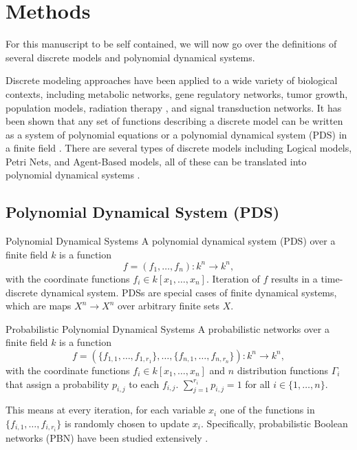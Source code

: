 \documentclass[11pt]{amsart}
\newenvironment{definition}[1][Definition]{\begin{trivlist}
\item[\hskip \labelsep {\bfseries #1}]}{\end{trivlist}}
\begin{document}
\section{Methods}
For this manuscript to be self contained, we will now go over the definitions
of several discrete models and polynomial dynamical systems.

Discrete modeling approaches have been applied
to a wide variety of biological contexts, including metabolic networks, gene
regulatory networks, tumor growth, population models, radiation therapy
\cite{Richard}, and signal transduction networks.
It has been shown that any set of functions describing a discrete model can be
written as a system of polynomial equations or a polynomial dynamical system
(PDS) in a finite field \cite{Lidl:1997}.
There are several types of discrete models including Logical models, Petri
Nets, and Agent-Based models, all of these can be translated into polynomial
dynamical systems \cite{Alan:Bioinf2010,Hinkelmann:2010}.

\subsection{Polynomial Dynamical System (PDS)}
\begin{definition}{Polynomial Dynamical Systems \cite{JLSS}}
A polynomial dynamical system (PDS) over a finite field $k$ is a function
$$f = (f_1, \ldots, f_n) : k^n \rightarrow k^n,$$
with the coordinate functions $f_i \in k[x_1, \ldots , x_n]$. Iteration of $f$ results
in a time-discrete dynamical system. PDSs are special cases of finite
dynamical systems, which are maps $X^n \rightarrow   X^n$ over arbitrary
finite sets $X$.
\end{definition}


\begin{definition}{Probabilistic Polynomial Dynamical Systems}
A probabilistic networks over a finite field $k$ is a function
$$f = (\{f_{1,1}, \ldots, f_{1, r_1}\}, \ldots, \{f_{n, 1}, \ldots, f_{n, r_n}
\}) : k^n \rightarrow k^n,$$
with the coordinate functions $f_i \in k[x_1, \ldots , x_n]$ and $n$
distribution functions $\Gamma_i$ that assign a probability $p_{i,j}$ to each
$f_{i,j}$. $\sum_{j=1} ^ {r_i} p_{i,j} = 1$ for all $i \in \{1, \ldots, n\}$.
\end{definition}
This means at every iteration, for each variable $x_i$ one of the functions in
$\{f_{i,1}, \ldots, f_{i, r_i}\}$ is randomly chosen to update $x_i$.
Specifically, probabilistic Boolean networks (PBN) have been studied
extensively \cite{shmulevich}.
\end{document}
